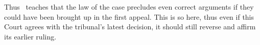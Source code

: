 \documentclass[12pt,\documentclassflag]{michiganCourtOfAppealsBrief}
\begin{document}

Thus \cite[s]{Bennett}\ teaches that the law of the case precludes even correct arguments if they could have been brought up in the first appeal. This is so here, thus even if this Court agrees with the tribunal's latest decision,
it should still reverse and affirm its earlier ruling.





\end{document}
